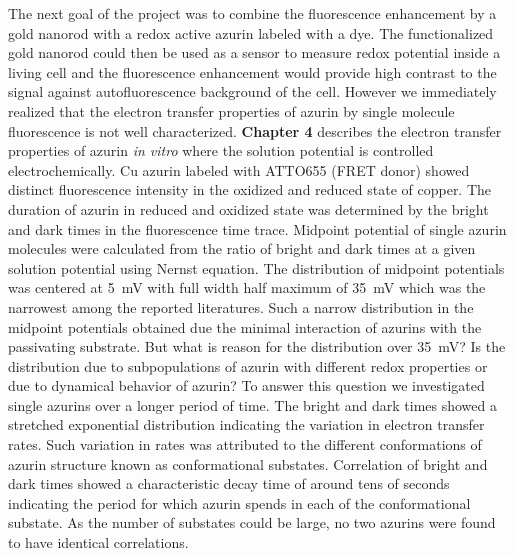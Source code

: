 The next goal of the project was to combine the fluorescence enhancement by a gold nanorod with a redox active azurin labeled with a dye.
The functionalized gold nanorod could then be used as a sensor to measure redox potential inside a living cell and the fluorescence enhancement would provide high contrast to the signal against autofluorescence background of the cell.
However we immediately realized that the electron transfer properties of azurin by single molecule fluorescence is not well characterized.
\textbf{Chapter 4} describes the electron transfer properties of azurin \textit{in vitro} where the solution potential is controlled electrochemically.
Cu azurin labeled with ATTO655 (FRET donor) showed distinct fluorescence intensity in the oxidized and reduced state of copper.
The duration of azurin in reduced and oxidized  state was determined by the bright and dark times in the fluorescence time trace.
Midpoint potential of single azurin molecules were calculated from the ratio of bright and dark times at a given solution potential using Nernst equation.
The distribution of midpoint potentials was centered at \SI{5}{\mV} with full width half maximum of \SI{35}{\mV} which was the narrowest among the reported literatures.
Such a narrow distribution in the midpoint potentials obtained due the minimal interaction of azurins with the passivating substrate.
But what is reason for the distribution over \SI{35}{\mV}?
Is the distribution due to subpopulations of azurin with different redox properties or due to dynamical behavior of azurin?
To answer this question we investigated single azurins over a longer period of time.
The bright and dark times showed a stretched exponential distribution indicating the variation in electron transfer rates.
Such variation in rates was attributed to the different conformations of azurin structure known as conformational substates.
Correlation of bright and dark times showed a characteristic decay time of around tens of seconds indicating the period for which azurin spends in each of the conformational substate.
As the number of substates could be large, no two azurins were found to have identical correlations.